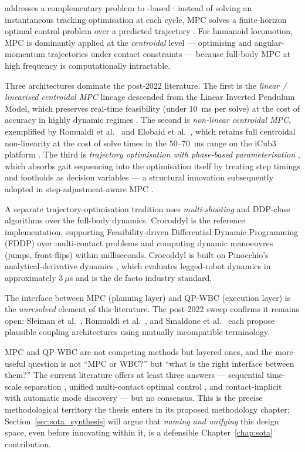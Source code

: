 \MPC{} addresses a complementary problem to \QP-based \WBC: instead of
solving an instantaneous tracking optimisation at each cycle, MPC solves
a finite-horizon optimal control problem over a predicted trajectory
\cite{Wensing2023Review}. For humanoid locomotion, MPC is dominantly
applied at the \emph{centroidal} level --- optimising \com{} and
angular-momentum trajectories under contact constraints
\cite{Caron2019,Romualdi2023,Elobaid2023} --- because full-body MPC at
high frequency is computationally intractable.

Three architectures dominate the post-2022 literature. The first is the
\emph{linear / linearised centroidal MPC} lineage descended from the
Linear Inverted Pendulum Model, which preserves real-time feasibility
(under $10$~ms per solve) at the cost of accuracy in highly dynamic
regimes \cite{Smaldone2022}. The second is \emph{non-linear centroidal MPC},
exemplified by Romualdi et al.\ \cite{Romualdi2023} and Elobaid et al.\
\cite{Elobaid2023}, which retains full centroidal non-linearity at the
cost of solve times in the $50$--$70$~ms range on the iCub3 platform
\cite{Elobaid2023}. The third is \emph{trajectory optimisation with
phase-based parameterisation} \cite{Winkler2018}, which absorbs gait
sequencing into the optimisation itself by treating step timings and
footholds as decision variables --- a structural innovation subsequently
adopted in step-adjustment-aware MPC \cite{Romualdi2023}.

A separate trajectory-optimisation tradition uses \emph{multi-shooting}
and DDP-class algorithms over the full-body dynamics. Crocoddyl
\cite{Crocoddyl} is the reference implementation, supporting
Feasibility-driven Differential Dynamic Programming (FDDP) over
multi-contact problems and computing dynamic manoeuvres (jumps,
front-flips) within milliseconds. Crocoddyl is built on Pinocchio's
analytical-derivative dynamics \cite{Pinocchio}, which evaluates
legged-robot dynamics in approximately $3~\mu$s and is the de facto
industry standard.

The interface between MPC (planning layer) and QP-WBC (execution layer)
is the \emph{unresolved} element of this literature. The post-2022 sweep
confirms it remains open: Sleiman et al.\ \cite{Sleiman2021}, Romualdi et al.\
\cite{Romualdi2023}, and Smaldone et al.\ \cite{Smaldone2025} each propose
plausible coupling architectures using mutually incompatible terminology.

\begin{criticalinsight}
MPC and QP-WBC are not competing methods but layered ones, and the more
useful question is not ``MPC or WBC?'' but ``what is the right interface
between them?'' The current literature offers at least three answers ---
sequential time-scale separation \cite{Romualdi2023}, unified multi-contact
optimal control \cite{Sleiman2021}, and contact-implicit \MPC{} with
automatic mode discovery \cite{LeCleach2024} --- but no consensus. This is the precise methodological
territory the thesis enters in its proposed methodology chapter;
Section~\ref{sec:sota_synthesis} will argue that \emph{naming and unifying}
this design space, even before innovating within it, is a defensible
Chapter~\ref{chap:sota} contribution.
\end{criticalinsight}


